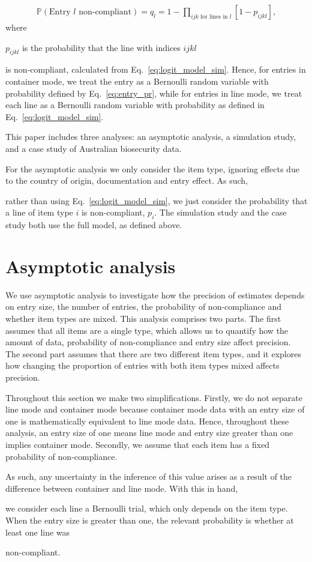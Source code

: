 \documentclass[useAMS,usenatbib,referee]{biom}
\newif\ifproofread
\newcommand{\rev}[1]{%
\ifproofread
\hl{#1}%
\else
#1%
\fi
}
\begin{document}
\begin{align}
\mathbb{P}\left(\text{Entry } l \text{ non-compliant}\right) = q_l = 1-\prod_{ijk \text{ for lines in }l}[1-p_{ijkl}],\label{eq:entry_pr}
\end{align}
where \rev{$p_{ijkl}$ is the probability that the line with indices $ijkl$} is non-compliant, calculated from Eq.~\eqref{eq:logit_model_sim}.
Hence, for entries in container mode, we treat the entry  as a Bernoulli random variable with probability defined by Eq.~\eqref{eq:entry_pr}, while for entries in line mode, we treat each line as a Bernoulli random variable with probability as defined in Eq.~\eqref{eq:logit_model_sim}.


This paper includes three analyses: an asymptotic analysis,
 a simulation study, and a case study of Australian biosecurity data. \rev{For the asymptotic analysis we only consider the item type, ignoring effects due to the country of origin, documentation and entry effect. As such,} rather than using Eq.~\eqref{eq:logit_model_sim}, we just consider the probability that a line of item type \(i\) is non-compliant, \(p_i\). The simulation study and the case study both use the full model, as defined above. 

\section{Asymptotic analysis}\label{sec:asymptotic_analysis}
We use asymptotic analysis to investigate how the precision of estimates depends on entry size, the number of entries, the probability of non-compliance and whether item types are mixed. This analysis comprises two parts. The first assumes that all items are a single type, which allows us to quantify how the amount of data, probability of non-compliance  and entry size affect precision. The second part assumes that there are two different item types, and it explores how changing the proportion of entries with both item types mixed affects precision.

Throughout this section we make two simplifications. Firstly, we do not separate line mode and container mode because container mode data with an entry size of one is mathematically equivalent to line mode data. Hence, throughout these analysis, an entry size of one means line mode and entry size greater than one implies container mode. Secondly, we  assume that each item has a fixed probability of non-compliance. \rev{As such, any uncertainty in the inference of this value arises as a result of the difference between container and line mode. With this in hand,} we consider each line a Bernoulli trial, which only depends on the item type. When the entry size is greater than one, the relevant probability is whether at least one line was \rev{non-compliant.}
\end{document}
